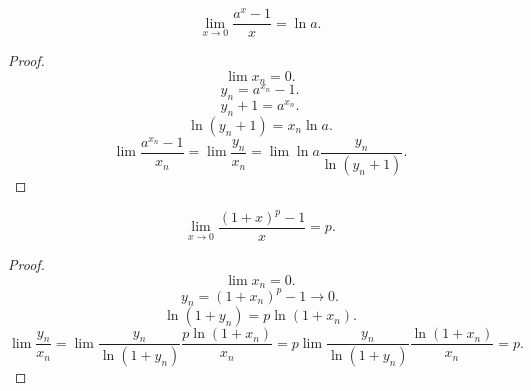 \documentclass[11pt, oneside]{article}   	%
\begin{document}
    \begin{theorem}
        \[ \lim\limits_{x \to 0} \frac{a^x-1}{x} = \ln a .\]
        \begin{proof}
            \[ \lim x_n = 0.\]
            \[ y_n = a^{x_n} - 1 .\]
            \[ y_n + 1 = a^{x_n} .\]
            \[ \ln\left( y_n+1 \right) = x_n\ln a  .\]
            \[ \lim \frac{a^{x_n}-1}{x_n} = \lim \frac{y_n}{x_n} = \lim \ln a\frac{y_n}{\ln (y_n+1)} .\] 
        \end{proof}
    \end{theorem}
    \begin{theorem}
        \[ \lim\limits_{x \to 0} \frac{(1+x)^{p}-1}{x} = p .\]
        \begin{proof}
            \[ \lim x_n = 0 .\]
            \[ y_n = \left( 1+x_n \right)^{p} - 1 \to 0.\]
            \[ \ln(1+y_n) = p\ln(1+x_n) .\]
            \[ \lim \frac{y_n}{x_n} = \lim \frac{y_n}{\ln\left( 1+y_n \right) }\frac{p\ln\left( 1+x_n \right) }{x_n} = p\lim \frac{y_n}{\ln(1+y_n)}\frac{\ln(1+x_n)}{x_n} =p .\] 
        \end{proof}
    \end{theorem}
\end{document}
